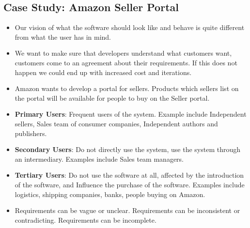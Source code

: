 \documentclass[a4paper]{article}
\begin{document}
\subsection{Case Study: Amazon Seller Portal}
\begin{itemize}
    \item Our vision of what the software should look like and behave is quite different from what the user has in mind.
    \item We want to make sure that developers understand what customers want, customers come to an agreement about their requirements. If this does not happen we could end up with increased cost and iterations.
    \item Amazon wants to develop a portal for sellers. Products which sellers list on the portal will be available for people to buy on the Seller portal.
    \item \textbf{Primary Users}: Frequent users of the system. Example include Independent sellers, Sales team of consumer companies, Independent authors and publishers.
    \item \textbf{Secondary Users}: Do not directly use the system, use the system through an intermediary. Examples include Sales team managers.
    \item \textbf{Tertiary Users}: Do not use the software at all, affected by the introduction of the software, and Influence the purchase of the software. Examples include logistics, shipping companies, banks, people buying on Amazon.
    \item Requirements can be vague or unclear. Requirements can be inconsistent or contradicting. Requirements can be incomplete.
\end{itemize}
\end{document}
